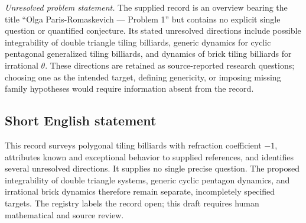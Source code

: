 \documentclass[11pt]{article}
\begin{document}
\emph{Unresolved problem statement.} The supplied record is an overview bearing the title ``Olga Paris-Romaskevich --- Problem 1'' but contains no explicit single question or quantified conjecture. Its stated unresolved directions include possible integrability of double triangle tiling billiards, generic dynamics for cyclic pentagonal generalized tiling billiards, and dynamics of brick tiling billiards for irrational \(\theta\). These directions are retained as source-reported research questions; choosing one as the intended target, defining genericity, or imposing missing family hypotheses would require information absent from the record.
\subsection{Short English statement}
This record surveys polygonal tiling billiards with refraction coefficient \(-1\), attributes known and exceptional behavior to supplied references, and identifies several unresolved directions. It supplies no single precise question. The proposed integrability of double triangle systems, generic cyclic pentagon dynamics, and irrational brick dynamics therefore remain separate, incompletely specified targets. The registry labels the record open; this draft requires human mathematical and source review.
\end{document}
